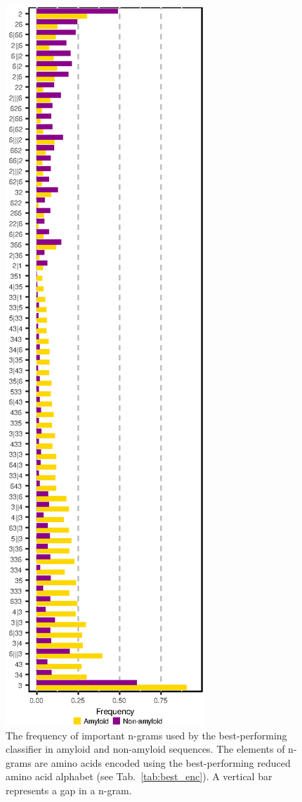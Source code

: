 \documentclass{bioinfo}
\begin{document}
\begin{figure}[!tpb]
\centerline{\includegraphics{figures/ngrams.eps}}
\caption{The frequency of important n-grams used by the best-performing classifier 
in amyloid and non-amyloid sequences. The elements of n-grams 
are amino acids encoded using the best-performing reduced amino acid 
alphabet (see Tab.~\ref{tab:best_enc}). A vertical bar 
represents a gap in a n-gram.}\label{fig:ngrams}
\end{figure}
\end{document}
